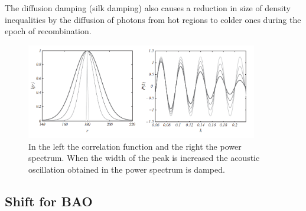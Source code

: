 The diffusion damping (silk damping)  also causes a reduction in size of density inequalities by the diffusion of photons from 
hot regions to colder ones during the epoch of recombination. 

\begin{figure}[htbp]
       \centering
               \includegraphics[width=0.9\textwidth]{Images/chapter2/width.png}
       \caption{\small In the left the correlation function and the right the power spectrum. When the width of the peak is increased
       the acoustic oscillation obtained in the power spectrum is damped.    }
       \label{peak}
 \end{figure}

\subsection{ Shift for BAO }
\label{shiftBAO}

